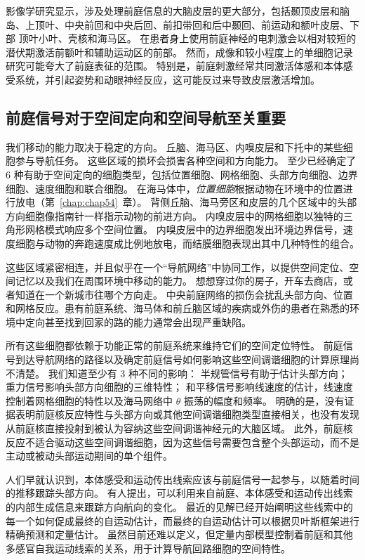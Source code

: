 影像学研究显示，涉及处理前庭信息的大脑皮层的更大部分，包括颞顶皮层和脑岛、上顶叶、中央前回和中央后回、前扣带回和后中颞回、前运动和额叶皮层、下部 顶叶小叶、壳核和海马区。
在患者身上使用前庭神经的电刺激会以相对较短的潜伏期激活前额叶和辅助运动区的前部。
然而，成像和较小程度上的单细胞记录研究可能夸大了前庭表征的范围。
特别是，前庭刺激经常共同激活体感和本体感受系统，并引起姿势和动眼神经反应，这可能反过来导致皮层激活增加。



\subsection{前庭信号对于空间定向和空间导航至关重要}

我们移动的能力取决于稳定的方向。
丘脑、海马区、内嗅皮层和下托中的某些细胞参与导航任务。
这些区域的损坏会损害各种空间和方向能力。
至少已经确定了 6 种有助于空间定向的细胞类型，包括位置细胞、网格细胞、头部方向细胞、边界细胞、速度细胞和联合细胞。
在海马体中，\textit{位置细胞}根据动物在环境中的位置进行放电（第~\ref{chap:chap54}~章）。
背侧丘脑、海马旁区和皮层的几个区域中的头部方向细胞像指南针一样指示动物的前进方向。
内嗅皮层中的网格细胞以独特的三角形网格模式响应多个空间位置。
内嗅皮层中的边界细胞发出环境边界信号，速度细胞与动物的奔跑速度成比例地放电，而结膜细胞表现出其中几种特性的组合。


这些区域紧密相连，并且似乎在一个“导航网络”中协同工作，以提供空间定位、空间记忆以及我们在周围环境中移动的能力。
想想穿过你的房子，开车去商店，或者知道在一个新城市往哪个方向走。
中央前庭网络的损伤会扰乱头部方向、位置和网格反应。患有前庭系统、海马体和前丘脑区域的疾病或外伤的患者在熟悉的环境中定向甚至找到回家的路的能力通常会出现严重缺陷。


所有这些细胞都依赖于功能正常的前庭系统来维持它们的空间定位特性。
前庭信号到达导航网络的路径以及确定前庭信号如何影响这些空间调谐细胞的计算原理尚不清楚。
我们知道至少有 3 种不同的影响： 半规管信号有助于估计头部方向；
重力信号影响头部方向细胞的三维特性；
和平移信号影响线速度的估计，线速度控制着网格细胞的特性以及海马网络中 $\theta$ 振荡的幅度和频率。
明确的是，没有证据表明前庭核反应特性与头部方向或其他空间调谐细胞类型直接相关，也没有发现从前庭核直接投射到被认为容纳这些空间调谐神经元的大脑区域。
此外，前庭核反应不适合驱动这些空间调谐细胞，因为这些信号需要包含整个头部运动，而不是主动或被动头部运动期间的单个组件。


人们早就认识到，本体感受和运动传出线索应该与前庭信号一起参与，以随着时间的推移跟踪头部方向。
有人提出，可以利用来自前庭、本体感受和运动传出线索的内部生成信息来跟踪方向航向的变化。
最近的见解已经开始阐明这些线索中的每一个如何促成最终的自运动估计，而最终的自运动估计可以根据贝叶斯框架进行精确预测和定量估计。
虽然目前还难以定义，但定量内部模型控制着前庭和其他多感官自我运动线索的关系，用于计算导航回路细胞的空间特性。




